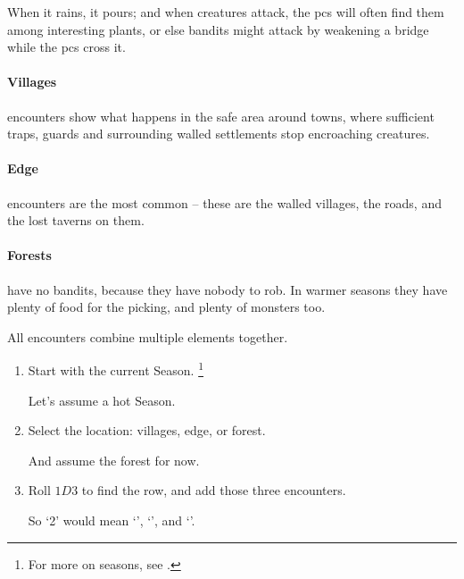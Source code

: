 \begin{multicols}{2}

\noindent
When it rains, it pours; and when creatures attack, the \glspl{pc} will often find them among interesting plants, or else bandits might attack by weakening a bridge while the \glspl{pc} cross it.

\paragraph{Villages}
encounters show what happens in the safe area around towns, where sufficient traps, \glspl{guard} and surrounding walled settlements stop encroaching creatures.

\paragraph{Edge}
encounters are the most common -- these are the walled villages, the roads, and the lost taverns on them.

\paragraph{Forests}
have no bandits, because they have nobody to rob.
In warmer seasons they have plenty of food for the picking, and plenty of monsters too.

All encounters combine multiple elements together.

\begin{enumerate}
  \item
  Start with the current Season.%
  \footnote{For more on seasons, see .}

  \begin{exampletext}
    Let's assume a hot Season.
  \end{exampletext}
  \item
  Select the location: villages, edge, or forest.

  \begin{exampletext}
    And assume the forest for now.
  \end{exampletext}
  \item
  Roll $1D3$ to find the row, and add those three encounters.

  \begin{exampletext}
    So `2' would mean
    \setcounter{enc}{1}%
    \setcounter{track}{2}%
    `\encBigList',
    `\encBigList', and
    `\encBigList'.
  \end{exampletext}


\end{enumerate}
\end{multicols}
